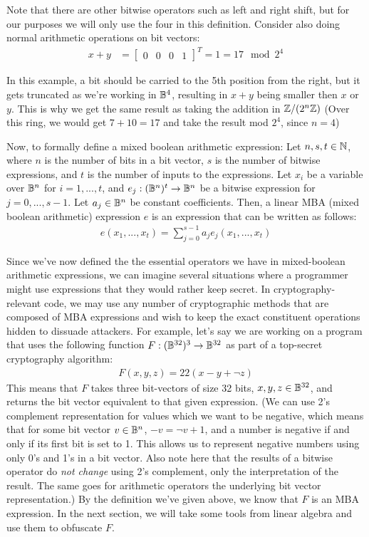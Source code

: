 Note that there are other bitwise operators such as left and right shift, but for our
purposes we will only use the four in this definition. Consider also doing normal arithmetic operations on bit vectors:
\begin{align*}
x + y &= \begin{bmatrix}
0 & 0 & 0 & 1 
\end{bmatrix}^T = 1 = 17 \mod 2^4 
\end{align*}
\par In this example, a bit should be carried to
the 5th position from the right, but it gets truncated as we're working in $\mathbb{B}^4$, resulting
in $x + y$ being smaller then $x$ or $y$. 
This is why we get the same result as taking the addition in
$\mathbb{Z}/(2^n\mathbb{Z})$ (Over this ring, we would get $7 + 10 = 17$ and take the result mod $2^4$, 
since $n=4$)
\par Now, to formally define a mixed boolean arithmetic expression:
 {Let $n,s,t \in \mathbb{N}$, where $n$ is the number of bits in a bit vector, 
$s$ is the number of bitwise expressions, and $t$ is the number of 
inputs to the expressions.
Let $x_i$ be a variable over $\mathbb{B}^n$ for
$i = 1,...,t$, and $e_j : (\mathbb{B}^n)^t \rightarrow \mathbb{B}^n$ be a bitwise expression for
$j = 0,...,s-1$. Let $a_j\in \mathbb{B}^n$ be constant coefficients.
Then, a linear MBA (mixed boolean arithmetic) expression $e$ is an expression that can be written as follows:
\begin{align*}
    e(x_1, ..., x_t) = \sum_{j=0}^{s-1} a_j e_j(x_1,...,x_t)
\end{align*}
}
\par Since we've now defined the the essential operators we have in mixed-boolean 
arithmetic
expressions, we can imagine several situations where a programmer might use expressions 
that they would rather keep secret. In cryptography-relevant code, we may use any
number of cryptographic methods that are composed of MBA 
expressions
and wish to keep the exact constituent operations hidden 
to dissuade attackers. For example, let's say we are working on a 
program that uses the following function $F : (\mathbb{B}^{32})^3 \rightarrow \mathbb{B}^{32}$ as part
of a top-secret cryptography algorithm:
\begin{align*}
    F(x, y, z) = 22(x - y + \neg z)
\end{align*}
This means  that $F$ takes three bit-vectors of size 32 bits, $x, y, z \in \mathbb{B}^{32}$, 
and returns the bit vector equivalent to that given expression. 
(We can use 2's complement representation for values which we want to be negative,
which means that for some bit vector $v \in \mathbb{B}^n$, $-v = \neg v + 1$,
and a number is negative if and only if its first bit is set to 1.
This allows us to represent negative numbers using only 0's and 1's in a bit vector. 
Also note here that the results of a bitwise operator do {\itshape not change} 
using 2's complement, only the  interpretation of the result. The same goes for 
arithmetic operators the underlying bit vector representation.)
By the definition we've given above, we know that $F$ is an MBA expression. 
In the next section, 
we will take some tools from linear algebra and use them to obfuscate $F$.
